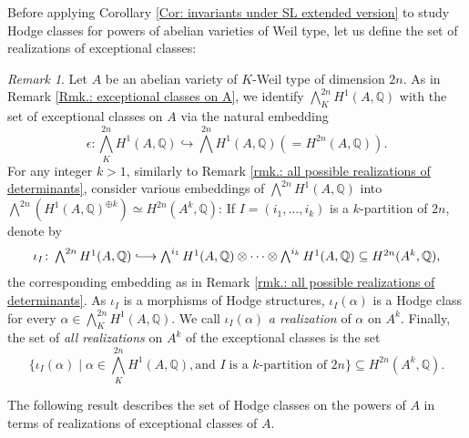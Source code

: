 \documentclass[11pt,twoside,a4paper]{amsart}
\newcommand{\0}{\mathscr{O}}
\newcommand{\Q}{\mathbb{Q}}
\theoremstyle{plain}
\theoremstyle{definition}
\theoremstyle{remark}
\newtheorem{rmk}[thm]{Remark}
\begin{document}
Before applying Corollary \ref{Cor: invariants under SL extended version} to study Hodge classes for powers of abelian varieties of Weil type, let us define the set of realizations of exceptional classes:
\begin{rmk}
\label{rmk.: all possible realization of the exceptional classes}
Let $A$ be an abelian variety of $K$-Weil type of dimension $2n$. As in Remark \ref{Rmk.: exceptional classes on A}, we identify $\bigwedge_{K}^{2n} H^1(A,\Q)$ with the set of exceptional classes on $A$ via the natural embedding
\[
\epsilon\colon\textstyle \bigwedge_{K}^{2n} H^1(A,\Q)\hookrightarrow \bigwedge^{2n} H^1(A,\Q) (= H^{2n}(A,\Q)).
\]
For any integer $k>1$, similarly to Remark \ref{rmk.: all possible realizations of determinants}, consider various embeddings of $\bigwedge^{2n} H^1(A,\Q)$ into $\bigwedge^{2n} (H^1(A,\Q)^{\oplus k})\simeq H^{2n}(A^k,\Q)$:
If $I=(i_1,\ldots,i_k)$ is a $k$-partition of $2n$, denote by
\[
\textstyle\iota_I\colon \bigwedge^{2n}H^1(A,\Q)\lhook\joinrel\longrightarrow \bigwedge^{i_1}H^1(A,\Q)\otimes\cdots\otimes\bigwedge^{i_k}H^1(A,\Q)\subseteq H^{2n}(A^k,\Q),
\]
the corresponding embedding as in Remark \ref{rmk.: all possible realizations of determinants}. As $\iota_I$ is a morphisms of Hodge structures, $\iota_I(\alpha)$ is a Hodge class for every $\alpha\in \bigwedge_{K}^{2n} H^1(A,\Q)$. We call $\iota_I(\alpha)$ \textit{a realization} of $\alpha$ on $A^k$. Finally, the set of \textit{all realizations} on $A^k$ of the exceptional classes is the set
\[
\{\iota_I(\alpha)\;|\; \alpha\in\textstyle \bigwedge_{K}^{2n} H^1(A,\Q), \text{and } I\; \text{is a } k \text{-partition of } 2n\}\subseteq H^{2n}(A^k,\Q).
\]
\end{rmk}

The following result describes the set of Hodge classes on the powers of $A$ in terms of realizations of exceptional classes of $A$.
\end{document}
